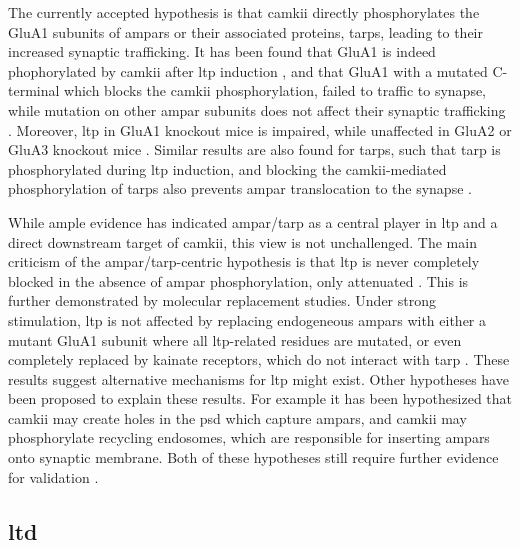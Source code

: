 The currently accepted hypothesis is that \gls{camkii} directly phosphorylates the GluA1 subunits of \glspl{ampar} or their associated proteins, \glspl{tarp}, leading to their increased synaptic trafficking. It has been found that GluA1 is indeed phophorylated by \gls{camkii} after \gls{ltp} induction \citep{mcglade-mcculloh93, barria97, lee03}, and that GluA1 with a mutated C-terminal which blocks the \gls{camkii} phosphorylation, failed to traffic to synapse, while mutation on other \gls{ampar} subunits does not affect their synaptic trafficking \citep{hayashi00, shi01}. Moreover, \gls{ltp} in GluA1 knockout mice is impaired, while unaffected in GluA2 or GluA3 knockout mice \citep{zamanillo99, meng03}. Similar results are also found for \glspl{tarp}, such that \gls{tarp} is phosphorylated during \gls{ltp} induction, and blocking the \gls{camkii}-mediated phosphorylation of \glspl{tarp} also prevents \gls{ampar} translocation to the synapse \citep{tomita05, sumioka10}.

While ample evidence has indicated \gls{ampar}\slash\gls{tarp} as a central player in \gls{ltp} and a direct downstream target of \gls{camkii}, this view is not unchallenged. The main criticism of the \gls{ampar}\slash\gls{tarp}-centric hypothesis is that \gls{ltp} is never completely blocked in the absence of \gls{ampar} phosphorylation, only attenuated \citep{herring16}. This is further demonstrated by molecular replacement studies. Under strong stimulation, \gls{ltp} is not affected by replacing endogeneous \glspl{ampar} with either a mutant GluA1 subunit where all \gls{ltp}-related residues are mutated, or even completely replaced by kainate receptors, which do not interact with \gls{tarp} \citep{granger13, chen03}. These results suggest alternative mechanisms for \gls{ltp} might exist. Other hypotheses have been proposed to explain these results. For example it has been hypothesized that \gls{camkii} may create holes in the \gls{psd} which capture \glspl{ampar}, and \gls{camkii} may phosphorylate recycling endosomes, which are responsible for inserting \glspl{ampar} onto synaptic membrane. Both of these hypotheses still require further evidence for validation \citep{herring16}.

\subsection{\gls{ltd}}

